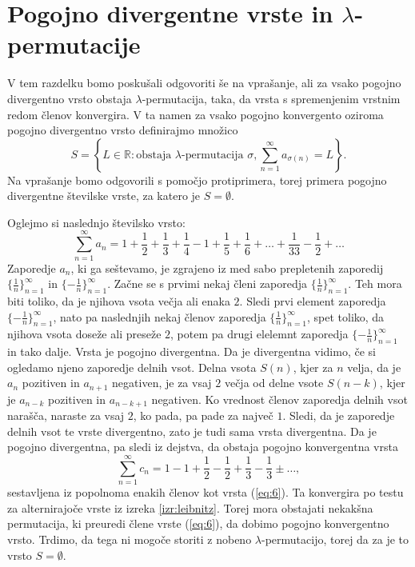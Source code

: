 \documentclass[12pt,a4paper,reqno]{amsart}
\theoremstyle{definition} %
\theoremstyle{plain} %
\begin{document}
\section{Pogojno divergentne vrste in $\lambda$-permutacije}\label{sec:mnS}

V tem razdelku bomo poskušali odgovoriti še na vprašanje, ali za vsako pogojno divergentno vrsto obstaja $\lambda$-permutacija, taka, da vrsta s spremenjenim vrstnim redom členov konvergira. V ta namen za vsako pogojno konvergento oziroma pogojno divergentno vrsto definirajmo množico $$S=\left \{L\in \mathbb{R}:\textrm{obstaja }\lambda \textrm{-permutacija } \sigma, \sum^{\infty}_{n=1}a_{\sigma (n)}=L\right \}.$$ Na vprašanje bomo odgovorili s pomočjo protiprimera, torej primera pogojno divergentne številske vrste, za katero je $S=\emptyset$. %

Oglejmo si naslednjo številsko vrsto:
\begin{equation}\label{eq:6}
\sum^{\infty}_{n=1}a_n = 1+\frac{1}{2}+\frac{1}{3}+\frac{1}{4}-1+\frac{1}{5}+\frac{1}{6}+ \dots +\frac{1}{33}-\frac{1}{2}+\dots
\end{equation}
Zaporedje $a_n$, ki ga seštevamo, je zgrajeno iz med sabo prepletenih zaporedij $\{\frac{1}{n}\}_{n=1}^{\infty}$ in $\{-\frac{1}{n}\}_{n=1}^{\infty}$. Začne se s prvimi nekaj členi zaporedja $\{\frac{1}{n}\}_{n=1}^{\infty}$. Teh mora biti toliko, da je njihova vsota večja ali enaka $2$. Sledi prvi element zaporedja $\{-\frac{1}{n}\}_{n=1}^{\infty}$, nato pa naslednjih nekaj členov zaporedja $\{\frac{1}{n}\}_{n=1}^{\infty}$, spet toliko, da njihova vsota doseže ali preseže $2$, potem pa drugi elelemnt zaporedja $\{-\frac{1}{n}\}_{n=1}^{\infty}$ in tako dalje. 
Vrsta je pogojno divergentna. Da je divergentna vidimo, če si ogledamo njeno zaporedje delnih vsot. Delna vsota $S(n)$, kjer za $n$ velja, da je $a_n$ pozitiven in $a_{n+1}$ negativen, je za vsaj $2$ večja od delne vsote $S(n-k)$, kjer je $a_{n-k}$ pozitiven in $a_{n-k+1}$ negativen. Ko vrednost členov zaporedja delnih vsot narašča, naraste za vsaj $2$, ko pada, pa pade za največ $1$. Sledi, da je zaporedje delnih vsot te vrste divergentno, zato je tudi sama vrsta divergentna.
Da je pogojno divergentna, pa sledi iz dejstva, da obstaja pogojno konvergentna vrsta $$\sum_{n=1}^{\infty}c_n=1-1+\frac{1}{2}-\frac{1}{2}+\frac{1}{3}-\frac{1}{3}\pm \ldots,$$ 
sestavljena iz popolnoma enakih členov kot vrsta (\ref{eq:6}). Ta konvergira po testu za alternirajoče vrste iz izreka \ref{izr:leibnitz}.
Torej mora obstajati nekakšna permutacija, ki preuredi člene vrste (\ref{eq:6}), da dobimo pogojno konvergentno vrsto.
Trdimo, da tega ni mogoče storiti z nobeno $\lambda$-permutacijo, torej da za je to vrsto $S=\emptyset$. 
\end{document}

